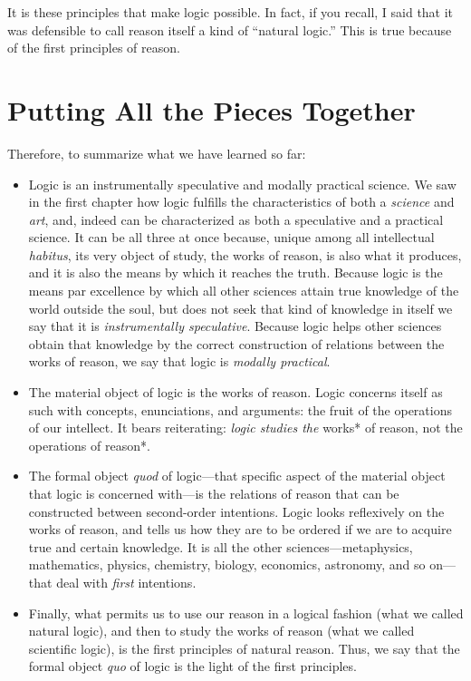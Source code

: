 \documentclass[
  12pt,
]{memoir}
\begin{document}
It is these principles that make logic possible. In fact, if you recall,
I said that it was defensible to call reason itself a kind of ``natural
logic.'' This is true because of the first principles of reason.

\section{Putting All the Pieces
Together}\label{putting-all-the-pieces-together}

Therefore, to summarize what we have learned so far:

\begin{itemize}
\item
  Logic is an instrumentally speculative and modally practical science.
  We saw in the first chapter how logic fulfills the characteristics of
  both a \emph{science} and \emph{art}, and, indeed can be characterized
  as both a speculative and a practical science. It can be all three at
  once because, unique among all intellectual \emph{habitus}, its very
  object of study, the works of reason, is also what it produces, and it
  is also the means by which it reaches the truth. Because logic is the
  means par excellence by which all other sciences attain true knowledge
  of the world outside the soul, but does not seek that kind of
  knowledge in itself we say that it is \emph{instrumentally
  speculative}. Because logic helps other sciences obtain that knowledge
  by the correct construction of relations between the works of reason,
  we say that logic is \emph{modally practical}.
\item
  The material object of logic is the works of reason. Logic concerns
  itself as such with concepts, enunciations, and arguments: the fruit
  of the operations of our intellect. It bears reiterating: \emph{logic
  studies the }works* of reason, not the operations of reason*.
\item
  The formal object \emph{quod} of logic---that specific aspect of the
  material object that logic is concerned with---is the relations of
  reason that can be constructed between second-order intentions. Logic
  looks reflexively on the works of reason, and tells us how they are to
  be ordered if we are to acquire true and certain knowledge. It is all
  the other sciences---metaphysics, mathematics, physics, chemistry,
  biology, economics, astronomy, and so on---that deal with \emph{first}
  intentions.
\item
  Finally, what permits us to use our reason in a logical fashion (what
  we called natural logic), and then to study the works of reason (what
  we called scientific logic), is the first principles of natural
  reason. Thus, we say that the formal object \emph{quo} of logic is the
  light of the first principles.
\end{itemize}
\end{document}
